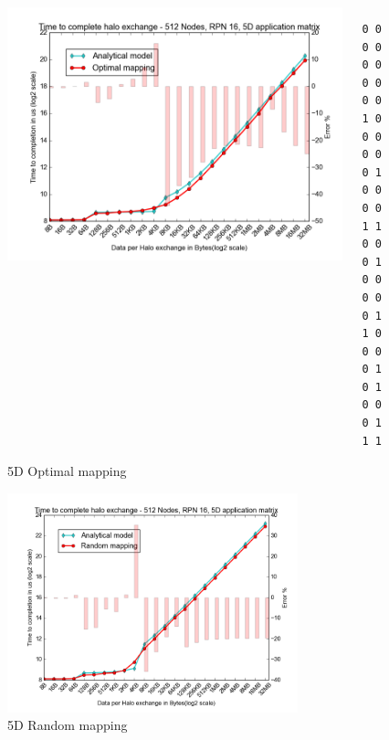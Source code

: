 \documentclass{beamer}
\begin{document}
\begin{frame}[fragile]
\begin{figure}
\caption{5D Optimal mapping}
\begin{columns}
  \begin{column}{0.6\textwidth}
    \includegraphics[width=1\textwidth]{../mappings/5d_optimal_model.png}
  \end{column}
  \begin{column}{0.3\textwidth}
\lstset{title=Mapping sample}
\begin{lstlisting}[basicstyle=\footnotesize\ttfamily, frame=lines,columns=fixed]
0 0 0 0 0 0
0 0 0 0 1 0
0 0 0 0 0 1
0 0 0 0 1 1
0 0 0 1 0 0
0 0 0 1 1 0
0 0 0 1 0 1
0 0 0 1 1 1
\end{lstlisting}
  \end{column}
\end{columns}
\end{figure}
\end{frame}


\begin{frame}
\begin{figure}
\caption{5D Random mapping}
    \includegraphics[width=0.75\textwidth]{../mappings/5d_random_model.png}
\end{figure}
\end{frame}
\end{document}

